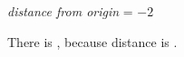 \myWideProblemWithContent
{
    {
    \small
    {\itshape distance from origin} = $-2$
    \begin{center}
    \end{center}
    }
    \normalsize
    There is  , because
    distance is  .
}

